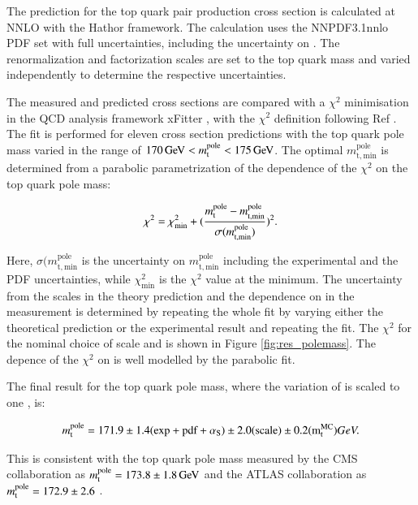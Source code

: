 The prediction for the top quark pair production cross section is calculated at NNLO \cite{PhysRevLett.109.132001,Czakon:2012zr,Czakon:2012pz,Czakon:2013goa} with the Hathor\cite{Aliev:2010zk} framework.
The calculation uses the NNPDF3.1nnlo PDF set \cite{Ball:2017nwa} with full uncertainties, including the uncertainty on \as.
The renormalization and factorization scales are set to the top quark mass and varied independently to determine the respective uncertainties.

The measured and predicted \ttbar cross sections are compared with a $\chi^2$ minimisation in the QCD analysis framework xFitter \cite{Alekhin:2014irh}, with the $\chi^2$ definition following Ref \cite{Abramowicz:2015mha}.
The fit is performed for eleven cross section predictions with the top quark pole mass varied in the range of $170 \,\text{Ge\hspace{-.08em}V} < m_\mathrm{t}^{\mathrm{pole}} < 175 \,\text{Ge\hspace{-.08em}V}$.
The optimal $m_\mathrm{t,min}^{\mathrm{pole}}$ is determined from a parabolic parametrization of the dependence of the $\chi^2$ on the top quark pole mass:

\begin{equation}
\chi^2 = \chi^2_{\mathrm{min}} + (\frac{m_\mathrm{t}^{\mathrm{pole}} - m_\mathrm{t,min}^{\mathrm{pole}}}{\sigma(m_\mathrm{t,min}^{\mathrm{pole}})})^2. 
\end{equation}

Here, $\sigma(m_\mathrm{t,min}^{\mathrm{pole}}$ is the uncertainty on $m_\mathrm{t,min}^{\mathrm{pole}}$ including the experimental and the PDF uncertainties, while $\chi^2_{\mathrm{min}}$ is the $\chi^2$ value at the minimum.
The uncertainty from the scales in the theory prediction and the dependence on \mtMC in the measurement is determined by repeating the whole fit by varying either the theoretical prediction or the experimental result
and repeating the fit.
The $\chi^2$ for the nominal choice of scale and \mtMC is shown in Figure \ref{fig:res_polemass}.
The depence of the $\chi^2$ on \mtp is well modelled by the parabolic fit.

The final result for the top quark pole mass, where the variation of \mtMC is scaled to one \GeV, is:

\begin{equation}
m_\mathrm{t}^{\mathrm{pole}} = 171.9 \pm 1.4 \mathrm{(exp+pdf+\alpha_\mathrm{S})} \pm 2.0 \mathrm{(scale)} \pm 0.2 \mathrm{(m_\mathrm{t}^{\mathrm{MC}})} GeV . 
\end{equation}

This is consistent with the top quark pole mass measured by the CMS collaboration as $m_\mathrm{t}^{\mathrm{pole}} = 173.8 \pm 1.8 \,\text{Ge\hspace{-.08em}V}$ \cite{Khachatryan:2016mqs} and the ATLAS collaboration as $m_\mathrm{t}^{\mathrm{pole}}=172.9 \pm 2.6$ \cite{Aad:2014kva}.

